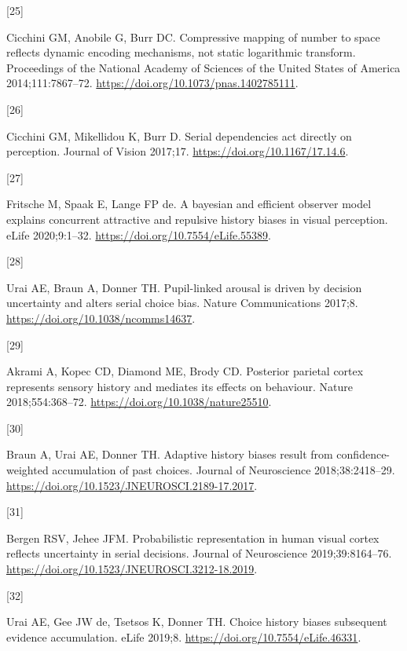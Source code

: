 \documentclass[
]{article}
\newlength{\cslhangindent}
\newlength{\csllabelwidth}
\newlength{\cslentryspacingunit} %
\newenvironment{CSLReferences}[2] %
 {%
  \setlength{\parindent}{0pt}
  \ifodd #1
  \let\oldpar\par
  \def\par{\hangindent=\cslhangindent\oldpar}
  \fi
  \setlength{\parskip}{#2\cslentryspacingunit}
 }%
 {}
\newcommand{\CSLLeftMargin}[1]{\parbox[t]{\csllabelwidth}{#1}}
\newcommand{\CSLRightInline}[1]{\parbox[t]{\linewidth - \csllabelwidth}{#1}\break}
\begin{document}
\begin{CSLReferences}{0}{0}
\leavevmode{}%
\CSLLeftMargin{{[}25{]} }%
\CSLRightInline{Cicchini GM, Anobile G, Burr DC. Compressive mapping of
number to space reflects dynamic encoding mechanisms, not static
logarithmic transform. Proceedings of the National Academy of Sciences
of the United States of America 2014;111:7867--72.
\url{https://doi.org/10.1073/pnas.1402785111}.}

\leavevmode{}%
\CSLLeftMargin{{[}26{]} }%
\CSLRightInline{Cicchini GM, Mikellidou K, Burr D. Serial dependencies
act directly on perception. Journal of Vision 2017;17.
\url{https://doi.org/10.1167/17.14.6}.}

\leavevmode{}%
\CSLLeftMargin{{[}27{]} }%
\CSLRightInline{Fritsche M, Spaak E, Lange FP de. A bayesian and
efficient observer model explains concurrent attractive and repulsive
history biases in visual perception. eLife 2020;9:1--32.
\url{https://doi.org/10.7554/eLife.55389}.}

\leavevmode{}%
\CSLLeftMargin{{[}28{]} }%
\CSLRightInline{Urai AE, Braun A, Donner TH. Pupil-linked arousal is
driven by decision uncertainty and alters serial choice bias. Nature
Communications 2017;8. \url{https://doi.org/10.1038/ncomms14637}.}

\leavevmode{}%
\CSLLeftMargin{{[}29{]} }%
\CSLRightInline{Akrami A, Kopec CD, Diamond ME, Brody CD. Posterior
parietal cortex represents sensory history and mediates its effects on
behaviour. Nature 2018;554:368--72.
\url{https://doi.org/10.1038/nature25510}.}

\leavevmode{}%
\CSLLeftMargin{{[}30{]} }%
\CSLRightInline{Braun A, Urai AE, Donner TH. Adaptive history biases
result from confidence-weighted accumulation of past choices. Journal of
Neuroscience 2018;38:2418--29.
\url{https://doi.org/10.1523/JNEUROSCI.2189-17.2017}.}

\leavevmode{}%
\CSLLeftMargin{{[}31{]} }%
\CSLRightInline{Bergen RSV, Jehee JFM. Probabilistic representation in
human visual cortex reflects uncertainty in serial decisions. Journal of
Neuroscience 2019;39:8164--76.
\url{https://doi.org/10.1523/JNEUROSCI.3212-18.2019}.}

\leavevmode{}%
\CSLLeftMargin{{[}32{]} }%
\CSLRightInline{Urai AE, Gee JW de, Tsetsos K, Donner TH. Choice history
biases subsequent evidence accumulation. eLife 2019;8.
\url{https://doi.org/10.7554/eLife.46331}.}


\end{CSLReferences}
\end{document}
